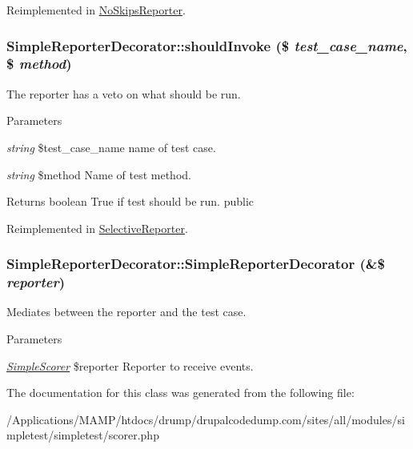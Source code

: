 Reimplemented in \hyperlink{class_no_skips_reporter_ab632d4c0baf0fc36a44c3ed6c3a3d1a4}{NoSkipsReporter}.\hypertarget{class_simple_reporter_decorator_a571852c647ef03d0486353aed21d79f9}{
\subsubsection[{shouldInvoke}]{\setlength{\rightskip}{0pt plus 5cm}SimpleReporterDecorator::shouldInvoke (\$ {\em test\_\-case\_\-name}, \/  \$ {\em method})}}
\label{class_simple_reporter_decorator_a571852c647ef03d0486353aed21d79f9}
The reporter has a veto on what should be run. 
\begin{DoxyParams}{Parameters}
\item[{\em string}]\$test\_\-case\_\-name name of test case. \item[{\em string}]\$method Name of test method. \end{DoxyParams}
\begin{DoxyReturn}{Returns}
boolean True if test should be run.  public 
\end{DoxyReturn}


Reimplemented in \hyperlink{class_selective_reporter_a33b86430bc37e8c5f35c246789a9a105}{SelectiveReporter}.\hypertarget{class_simple_reporter_decorator_af6326eea5974fd37bfe2dd5e3a58fcf5}{
\subsubsection[{SimpleReporterDecorator}]{\setlength{\rightskip}{0pt plus 5cm}SimpleReporterDecorator::SimpleReporterDecorator (\&\$ {\em reporter})}}
\label{class_simple_reporter_decorator_af6326eea5974fd37bfe2dd5e3a58fcf5}
Mediates between the reporter and the test case. 
\begin{DoxyParams}{Parameters}
\item[{\em \hyperlink{class_simple_scorer}{SimpleScorer}}]\$reporter Reporter to receive events. \end{DoxyParams}


The documentation for this class was generated from the following file:\begin{DoxyCompactItemize}
\item 
/Applications/MAMP/htdocs/drump/drupalcodedump.com/sites/all/modules/simpletest/simpletest/scorer.php\end{DoxyCompactItemize}
